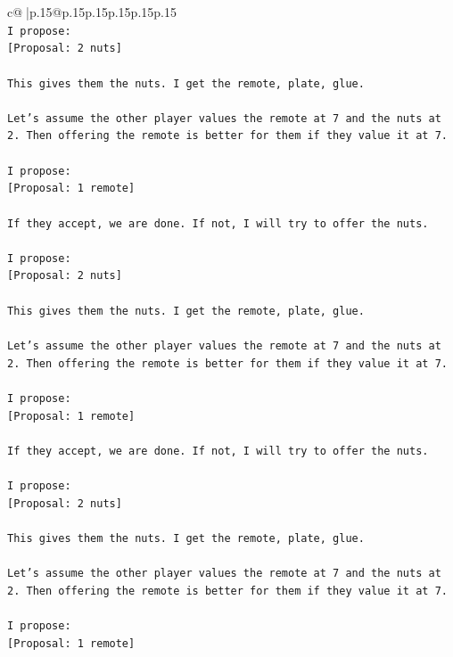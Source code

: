 \documentclass{article}
\begin{document}
{\begin{supertabular}{c@{$\;$}|p{.15\linewidth}@{}p{.15\linewidth}p{.15\linewidth}p{.15\linewidth}p{.15\linewidth}p{.15\linewidth}}
{{{\\ 
\texttt{I propose:} \\
\texttt{{[}Proposal: 2 nuts{]}} \\
\\ 
\texttt{This gives them the nuts. I get the remote, plate, glue.} \\
\\ 
\texttt{Let's assume the other player values the remote at 7 and the nuts at 2. Then offering the remote is better for them if they value it at 7.} \\
\\ 
\texttt{I propose:} \\
\texttt{{[}Proposal: 1 remote{]}} \\
\\ 
\texttt{If they accept, we are done. If not, I will try to offer the nuts.} \\
\\ 
\texttt{I propose:} \\
\texttt{{[}Proposal: 2 nuts{]}} \\
\\ 
\texttt{This gives them the nuts. I get the remote, plate, glue.} \\
\\ 
\texttt{Let's assume the other player values the remote at 7 and the nuts at 2. Then offering the remote is better for them if they value it at 7.} \\
\\ 
\texttt{I propose:} \\
\texttt{{[}Proposal: 1 remote{]}} \\
\\ 
\texttt{If they accept, we are done. If not, I will try to offer the nuts.} \\
\\ 
\texttt{I propose:} \\
\texttt{{[}Proposal: 2 nuts{]}} \\
\\ 
\texttt{This gives them the nuts. I get the remote, plate, glue.} \\
\\ 
\texttt{Let's assume the other player values the remote at 7 and the nuts at 2. Then offering the remote is better for them if they value it at 7.} \\
\\ 
\texttt{I propose:} \\
\texttt{{[}Proposal: 1 remote{]}} \\
\\ 
}}}
\end{supertabular}}
\end{document}
